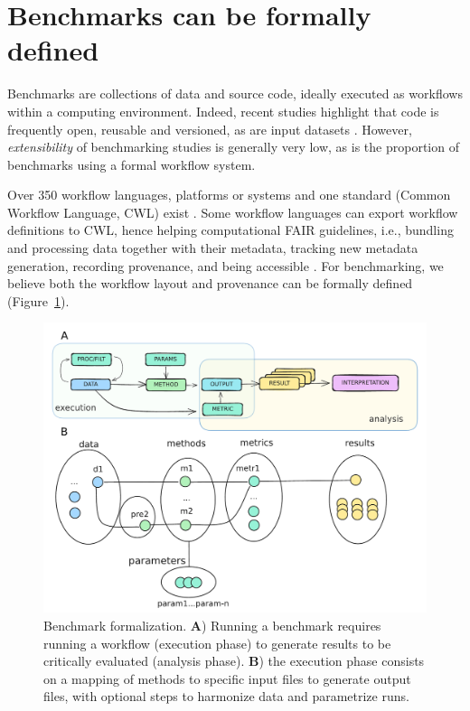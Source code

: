 \documentclass[11pt]{article}
\begin{document}
\section*{Benchmarks can be formally defined}

Benchmarks are collections of data and source code, ideally executed as workflows within a computing environment. Indeed, recent studies highlight that code is frequently open, reusable and versioned, as are input datasets \cite{cao2023-jz, Sonrel2023-te}. However, \textit{extensibility} of benchmarking studies is generally very low, as is the proportion of benchmarks using a formal workflow system. 

Over 350 workflow languages, platforms or systems  \cite{Wratten2021-el, Amstutz2024-qk} and one standard (Common Workflow Language, CWL) exist \cite{Amstutz2016-vo}. Some workflow languages can export workflow definitions to CWL, hence helping computational FAIR guidelines, i.e., bundling and processing data together with their metadata, tracking new metadata generation, recording provenance, and being accessible \cite{Goble2020-ps}. For benchmarking, we believe both the workflow layout and provenance can be formally defined (Figure~\ref{fig:formalization}). 


\begin{figure}
    \centering
    \includegraphics[width=0.75\linewidth]{figures/bens_formalization.pdf}
    \caption[Benchmark formalization.]{Benchmark formalization. \textbf{A}) Running a benchmark requires running a workflow (execution phase) to generate results to be critically evaluated (analysis phase). \textbf{B}) the execution phase consists on a mapping of methods to specific input files to generate output files, with optional steps to harmonize data and parametrize runs.}
    \label{fig:formalization}
\end{figure}
\end{document}
